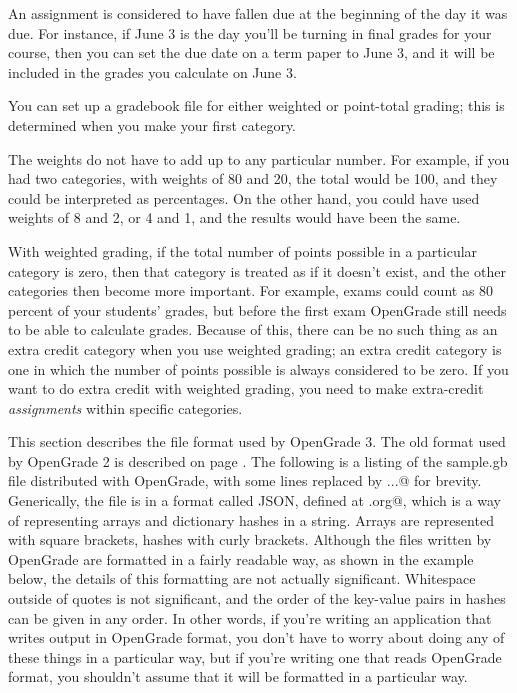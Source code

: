 \documentclass{opengrade_doc}
\begin{document}
An assignment is considered to have fallen due at the beginning of the day
it was due. For instance, if June 3 is the day you'll be turning in final
grades for your course, then you can set the due date on a term paper to
June 3, and it will be included in the grades you calculate on June 3.

\label{weightedgrading}
You can set up a gradebook file for either weighted or point-total grading; this
is determined when you make your first category.

The weights do not have to add up to any particular number. For example, if
you had two categories, with weights of 80 and 20, the total would be
100, and they could be interpreted as percentages. On the other hand, you
could have used weights of 8 and 2, or 4 and 1, and the results would have
been the same.

With weighted
grading, if the total number of points possible in a particular category
is zero, then that category is treated as if it doesn't exist, and the
other categories then become more important. For example, exams could
count as 80 percent of your students' grades, but before the first exam
OpenGrade still needs to be able to calculate grades.
Because of this, there can be no such thing as an extra credit category
when you use weighted grading; an extra credit category is one in which
the number of points possible is always considered to be zero. If you
want to do extra credit with weighted grading, you need to make extra-credit
\emph{assignments} within specific categories.

\label{format}
This section describes the file format used by OpenGrade 3.
The old format used by OpenGrade 2 is described on page \pageref{old-format}.
The following is a listing of the sample.gb file distributed with OpenGrade,
with some lines replaced by \verb@...@ for brevity. Generically, the file
is in a format called JSON, defined at \verb@json.org@, which is a way of
representing arrays and dictionary hashes in a string. Arrays are represented
with square brackets, hashes with curly brackets. Although the files
written by OpenGrade are formatted in a fairly readable way, as shown in the
example below, the details of this formatting are not actually significant.
Whitespace outside of quotes is not significant, and the order of the key-value
pairs in hashes can be given in any order. In other words, if you're writing
an application that writes output in OpenGrade format, you don't have to
worry about doing any of these things in a particular way, but if you're
writing one that reads OpenGrade format, you shouldn't assume that it
will be formatted in a particular way.
\end{document}
